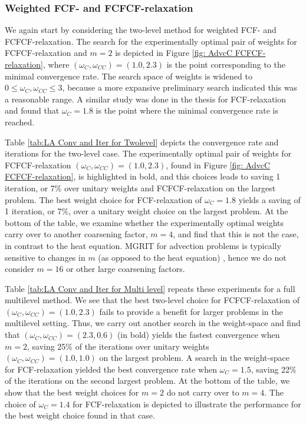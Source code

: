 \documentclass[VANCOUVER,STIX1COL]{WileyNJD-v2}
\begin{document}
\subsubsection{Weighted FCF- and FCFCF-relaxation}
We again start by considering the two-level method for weighted FCF- and FCFCF-relaxation. The search for 
the experimentally optimal pair of weights for FCFCF-relaxation and $m=2$ is depicted in Figure 
\ref{fig: AdvcC FCFCF-relaxation}, where $(\omega_C, \omega_{CC}) = (1.0, 2.3)$ is the point corresponding to the minimal
convergence rate.  The search space of weights is widened to $0 \le \omega_C, \omega_{CC} \le 3$, because 
a more expansive preliminary search indicated this was a reasonable range. A similar 
study was done in the thesis \cite{Su2019} for FCF-relaxation and found that 
$\omega_{C} = 1.8$ is the point where the minimal convergence rate is reached.

Table \ref{tab:LA Conv and Iter for Twolevel} depicts the convergence rate and iterations for 
the two-level case.  The experimentally optimal pair of weights for FCFCF-relaxation $(\omega_C, \omega_{CC}) = (1.0, 2.3)$, found
in Figure \ref{fig: AdvcC FCFCF-relaxation}, is highlighted in bold, and this choices leads to saving 1 iteration, or 
7\% over unitary weights and FCFCF-relaxation on the largest problem.  The best weight choice for FCF-relaxation of $\omega_C = 1.8$
yields a saving of 1 iteration, or 7\%, over a unitary weight choice on the largest problem. 
At the bottom of the table, we examine whether the experimentally optimal weights carry over 
to another coarsening factor, $m=4$, and find that this is not the case, in contrast to the heat equation.  
MGRIT for advection problems is typically sensitive to changes in $m$ (as opposed to the heat equation) \cite{Do2016, HoDeFaMaSc2019}, hence we do not consider $m=16$ or other large coarsening factors.

Table \ref{tab:LA Conv and Iter for Multi level} repeats these experiments for a full multilevel method.
We see that the best two-level choice for FCFCF-relaxation of 
$(\omega_C, \omega_{CC}) = (1.0, 2.3)$ fails to provide a benefit for larger problems 
in the multilevel setting.  Thus, we carry out 
another search in the weight-space and find that $(\omega_C, \omega_{CC}) = (2.3, 0.6)$ (in bold) yields 
the fastest convergence when $m=2$, saving 25\% of the iterations over unitary weights 
$(\omega_C, \omega_{CC}) = (1.0, 1.0)$ on the largest problem.  A search in the weight-space
for FCF-relaxation yielded the best convergence rate when $\omega_C = 1.5$, 
saving 22\% of the iterations on the second largest problem.  At the bottom of the table, we 
show that the best weight choices for $m=2$ do not carry over to $m=4$.  The choice of $\omega_C =
1.4$ for FCF-relaxation is depicted to illustrate the performance for the best weight choice found in 
that case.
\end{document}
